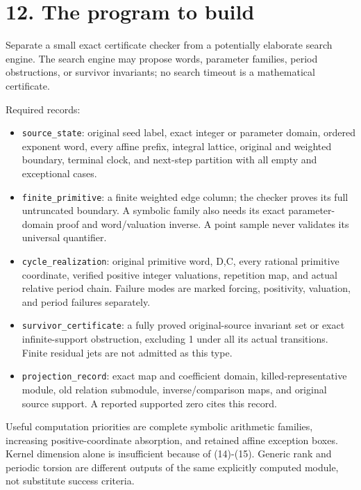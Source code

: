 \section{12. The program to build}

Separate a small exact certificate checker from a potentially elaborate
search engine. The search engine may propose words, parameter families,
period obstructions, or survivor invariants; no search timeout is a
mathematical certificate.

Required records:

\begin{itemize}
\tightlist
\item
  \nolinkurl{source_state}: original seed label, exact integer or
  parameter domain, ordered exponent word, every affine prefix, integral
  lattice, original and weighted boundary, terminal clock, and next-step
  partition with all empty and exceptional cases.
\item
  \nolinkurl{finite_primitive}: a finite weighted edge column; the
  checker proves its full untruncated boundary. A symbolic family also
  needs its exact parameter-domain proof and word/valuation inverse. A
  point sample never validates its universal quantifier.
\item
  \nolinkurl{cycle_realization}: original primitive word, D,C, every
  rational primitive coordinate, verified positive integer valuations,
  repetition map, and actual relative period chain. Failure modes are
  marked forcing, positivity, valuation, and period failures separately.
\item
  \nolinkurl{survivor_certificate}: a fully proved original-source
  invariant set or exact infinite-support obstruction, excluding 1 under
  all its actual transitions. Finite residual jets are not admitted as
  this type.
\item
  \nolinkurl{projection_record}: exact map and coefficient domain,
  killed-representative module, old relation submodule,
  inverse/comparison maps, and original source support. A reported
  supported zero cites this record.
\end{itemize}

Useful computation priorities are complete symbolic arithmetic families,
increasing positive-coordinate absorption, and retained affine exception
boxes. Kernel dimension alone is insufficient because of (14)-(15).
Generic rank and periodic torsion are different outputs of the same
explicitly computed module, not substitute success criteria.

